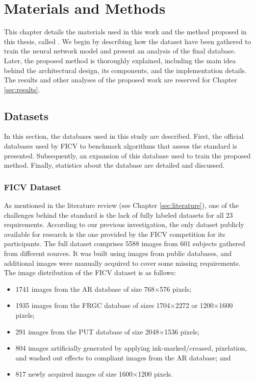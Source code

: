 \section{Materials and Methods} \label{sec:method}
 
This chapter details the materials used in this work and the method proposed in this thesis, called \methodname. We begin by describing how the dataset have been gathered to train the neural network model and present an analysis of the final database. Later, the proposed method is thoroughly explained, including the main idea behind the architectural design, its components, and the implementation details. The results and other analyses of the proposed work are reserved for Chapter \ref{sec:results}.
 
\subsection{Datasets}
 
In this section, the databases used in this study are described. First, the official databases used by FICV to benchmark algorithms that assess the \icao standard is presented. Subsequently, an expansion of this database used to train the proposed method. Finally, statistics about the database are detailed and discussed.
 
\subsubsection{FICV Dataset} \label{sec:database}
 
As mentioned in the literature review (see Chapter \ref{sec:literature}), one of the challenges behind the \icao standard is the lack of fully labeled datasets for all 23 requirements. According to our previous investigation, the only dataset publicly available for research is the one provided by the FICV competition for its participants. The full dataset comprises 5588 images from 601 subjects gathered from different sources. It was built \adhoc using images from public databases, and additional images were manually acquired to cover some missing requirements. The image distribution of the FICV dataset is as follows:
 
\begin{itemize}
\item 1741 images from the AR database \citep{martinez1998ar} of size 768$\times$576 pixels;
\item 1935 images from the FRGC database \citep{databaseFRGC} of sizes 1704$\times$2272 or 1200$\times$1600 pixels;
\item 291 images from the PUT database \citep{kasinski2008put} of size 2048$\times$1536 pixels;
\item 804 images artificially generated by applying ink-marked/creased, pixelation, and washed out effects to compliant images from the AR database; and
\item 817 newly acquired images of size 1600$\times$1200 pixels.
\end{itemize}
 
